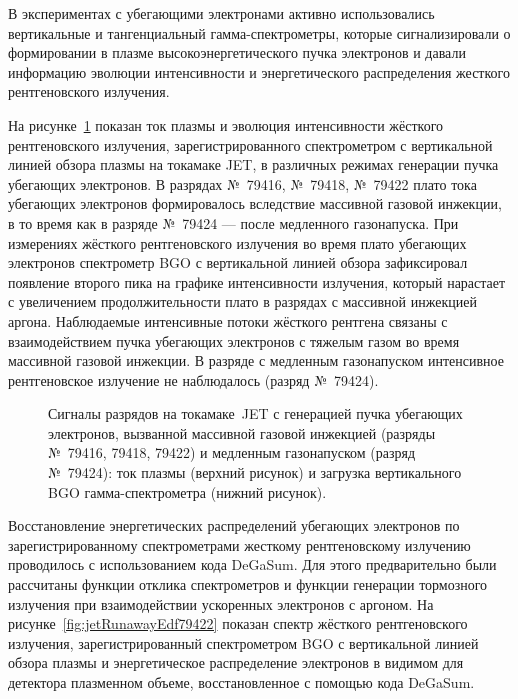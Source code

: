 В экспериментах с убегающими электронами активно использовались вертикальные и тангенциальный гамма-спектрометры, которые сигнализировали о формировании в плазме высокоэнергетического пучка электронов и давали информацию эволюции интенсивности и энергетического распределения жесткого рентгеновского излучения.~\cite{Reux2015_Mit}

На рисунке~\ref{fig:jetRunawayHxr79416} показан ток плазмы и эволюция интенсивности жёсткого рентгеновского излучения, зарегистрированного спектрометром с вертикальной линией обзора плазмы на токамаке JET, в различных режимах генерации пучка убегающих электронов. В разрядах №~79416, №~79418, №~79422 плато тока убегающих электронов формировалось вследствие массивной газовой инжекции, в то время как в разряде №~79424 --- после медленного газонапуска. При измерениях жёсткого рентгеновского излучения во время плато убегающих электронов спектрометр BGO с вертикальной линией обзора зафиксировал появление второго пика на графике интенсивности излучения, который нарастает с увеличением продолжительности плато в разрядах с массивной инжекцией аргона. Наблюдаемые интенсивные потоки жёсткого рентгена связаны с взаимодействием пучка убегающих электронов с тяжелым газом во время массивной газовой инжекции. В разряде с медленным газонапуском интенсивное рентгеновское излучение не наблюдалось (разряд №~79424).~\cite{Plyusnin2012Fec}

\begin{figure}[ht!]
  \caption{Сигналы разрядов на токамаке~JET с генерацией пучка убегающих электронов, вызванной массивной газовой инжекцией (разряды №~79416, 79418, 79422) и медленным газонапуском (разряд №~79424): ток плазмы (верхний рисунок) и загрузка вертикального BGO гамма-спектрометра (нижний рисунок).~\cite{Plyusnin2012Fec} }
  \label{fig:jetRunawayHxr79416}
\end{figure}

Восстановление энергетических распределений убегающих электронов по зарегистрированному спектрометрами жесткому рентгеновскому излучению проводилось с использованием кода DeGaSum. Для этого предварительно были рассчитаны функции отклика спектрометров и функции генерации тормозного излучения при взаимодействии ускоренных электронов с аргоном. На рисунке~\ref{fig:jetRunawayEdf79422} показан спектр жёсткого рентгеновского излучения, зарегистрированный спектрометром BGO с вертикальной линией обзора плазмы и энергетическое распределение электронов в видимом для детектора плазменном объеме, восстановленное с помощью кода DeGaSum.~\cite{Plyusnin2012Fec}

